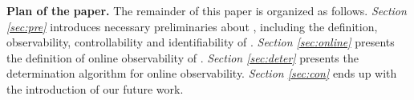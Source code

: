 \medskip\noindent
{\bf Plan of the paper.}
The remainder of this paper is organized as follows.
 {\em Section \ref{sec:pre}} introduces necessary preliminaries about \BCNs, including the definition, observability, controllability and identifiability of \BCNs. {\em Section \ref{sec:online}} presents the definition of online observability of \BCNs. {\em Section \ref{sec:deter}} presents the determination algorithm for online observability. 
 {\em Section \ref{sec:con}} ends up with the introduction of our future work.

